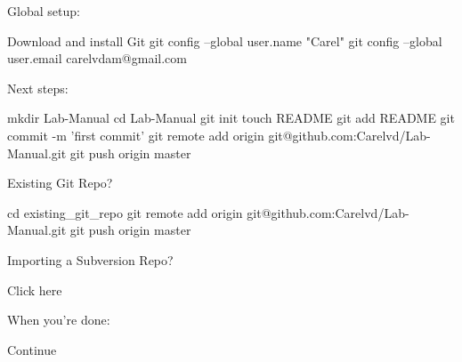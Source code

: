 
Global setup:

 Download and install Git
  git config --global user.name "Carel"
  git config --global user.email carelvdam@gmail.com
        

Next steps:

  mkdir Lab-Manual
  cd Lab-Manual
  git init
  touch README
  git add README
  git commit -m 'first commit'
  git remote add origin git@github.com:Carelvd/Lab-Manual.git
  git push origin master
      

Existing Git Repo?

  cd existing_git_repo
  git remote add origin git@github.com:Carelvd/Lab-Manual.git
  git push origin master
      

Importing a Subversion Repo?

  Click here
      

When you're done:

  Continue

